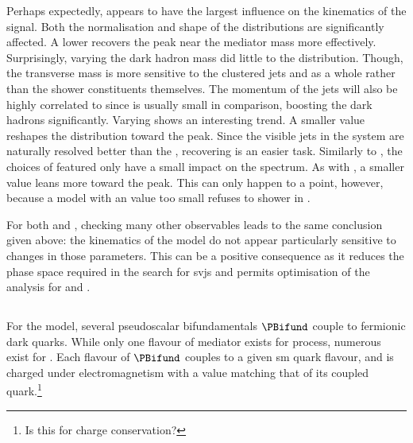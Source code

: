Perhaps expectedly, \mZprime appears to have the largest influence on the kinematics of the signal. Both the normalisation and shape of the distributions are significantly affected. A lower \mZprime recovers the peak near the mediator mass more effectively. Surprisingly, varying the dark hadron mass did little to the distribution. Though, the transverse mass is more sensitive to the clustered \glspl{jet} and \ptmiss as a whole rather than the shower constituents themselves. The momentum of the \glspl{jet} will also be highly correlated to \mZprime since \mDark is usually small in comparison, boosting the dark hadrons significantly. Varying \rinv shows an interesting trend. A smaller value reshapes the \mT distribution toward the \mZprime peak. Since the visible \glspl{jet} in the system are naturally resolved better than the \ptmiss, recovering \mZprime is an easier task. Similarly to \mDark, the choices of \aDark featured only have a small impact on the \mT spectrum. As with \rinv, a smaller value leans more toward the \mZprime peak. This can only happen to a point, however, because a model with an \aDark value too small refuses to shower in \PYTHIA.

For both \mDark and \aDark, checking many other observables leads to the same conclusion given above: the kinematics of the model do not appear particularly sensitive to changes in those parameters. This can be a positive consequence as it reduces the phase space required in the search for \glspl{svj} and permits optimisation of the analysis for \mZprime and \rinv.





\subsection{\texorpdfstring{\tchannel}{t-channel}}
\label{subsec:svj_signal_madgraph_tchannel}

For the \tchannel model, several pseudoscalar bifundamentals $\PBifund$ couple to fermionic dark quarks. While only one flavour of mediator exists for \schannel process, numerous exist for \tchannel. Each flavour of $\PBifund$ couples to a given \acrshort{sm} quark flavour, and is charged under electromagnetism with a value matching that of its coupled quark.\footnote{Is this for charge conservation?}

